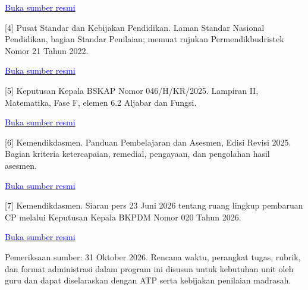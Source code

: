 \documentclass[11pt,a4paper]{article}
\begin{document}
\href{https://jdih.kemendikdasmen.go.id/sjdih/siperpu/dokumen/abstraksi/Abstrak%20RPM%20Standar%20Proses.pdf}{\small\textcolor{blue}{Buka sumber resmi}}\par
\vspace{8.50393701pt}
[4] Pusat Standar dan Kebijakan Pendidikan. Laman Standar Nasional Pendidikan, bagian Standar Penilaian; memuat rujukan Permendikbudristek Nomor 21 Tahun 2022.\par\medskip
\href{https://pskp.kemendikdasmen.go.id/standar-nasional-pendidikan-a/standar-proses}{\small\textcolor{blue}{Buka sumber resmi}}\par
\vspace{8.50393701pt}
[5] Keputusan Kepala BSKAP Nomor 046/H/KR/2025. Lampiran II, Matematika, Fase F, elemen 6.2 Aljabar dan Fungsi.\par\medskip
\href{https://bpmpbabel.kemendikdasmen.go.id/PPID/wp-content/uploads/2025/07/KepKaBSKAP-046_2025-ttg-CP.pdf}{\small\textcolor{blue}{Buka sumber resmi}}\par
\vspace{8.50393701pt}
[6] Kemendikdasmen. Panduan Pembelajaran dan Asesmen, Edisi Revisi 2025. Bagian kriteria ketercapaian, remedial, pengayaan, dan pengolahan hasil asesmen.\par\medskip
\href{https://kurikulum.kemendikdasmen.go.id/file/1755668120_manage_file.pdf}{\small\textcolor{blue}{Buka sumber resmi}}\par
\vspace{8.50393701pt}
[7] Kemendikdasmen. Siaran pers 23 Juni 2026 tentang ruang lingkup pembaruan CP melalui Keputusan Kepala BKPDM Nomor 020 Tahun 2026.\par\medskip
\href{https://www.kemendikdasmen.go.id/siaran-pers/15636-capaian-pembelajaran-baru-telah-terbit-yang-berubah-hanya-mata-pelajaran-agama-dan-budi-pekerti}{\small\textcolor{blue}{Buka sumber resmi}}\par
\vspace{8.50393701pt}
{\small Pemeriksaan sumber: 31 Oktober 2026. Rencana waktu, perangkat tugas, rubrik, dan format administrasi dalam program ini disusun untuk kebutuhan unit oleh guru dan dapat diselaraskan dengan ATP serta kebijakan penilaian madrasah.\par}\medskip
\end{document}
